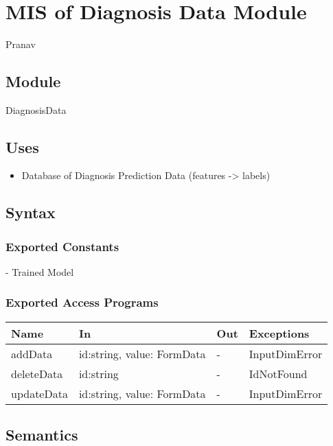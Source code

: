 \documentclass[12pt, titlepage]{article}
\begin{document}
\newpage
~\newpage



\section{MIS of Diagnosis Data Module} \label{diag_data} Pranav

\subsection{Module}

DiagnosisData

\subsection{Uses}
\begin{itemize}
  \item Database of Diagnosis Prediction Data (features -> labels)
\end{itemize}

\subsection{Syntax}

\subsubsection{Exported Constants}
- Trained Model

\subsubsection{Exported Access Programs}

\begin{center}
\begin{tabular}{p{2cm} p{4cm} p{4cm} p{2cm}}
\hline
\textbf{Name} & \textbf{In} & \textbf{Out} & \textbf{Exceptions} \\
\hline
addData & id:string, value: FormData & - & InputDimError \\
deleteData & id:string & - & IdNotFound\\
updateData & id:string, value: FormData & - & InputDimError \\
\hline
\end{tabular}
\end{center}

\subsection{Semantics}
\end{document}
